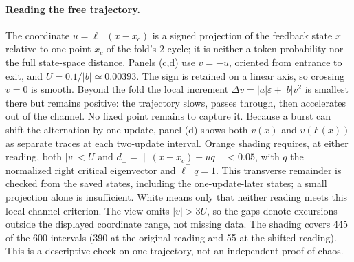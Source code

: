 \documentclass[11pt,letterpaper]{article}
\newcommand{\eps}{\varepsilon}
\begin{document}
\paragraph{Reading the free trajectory.}
The coordinate $u=\ell^\top(x-x_c)$ is a signed projection of the feedback state $x$ relative to one point $x_c$
of the fold's 2-cycle; it is neither a token probability nor the full state-space distance.
Panels (c,d) use $v=-u$, oriented from entrance to exit, and $U=0.1/|b|\simeq0.00393$.
The sign is retained on a linear axis, so crossing $v=0$ is smooth. Beyond the fold the local increment
$\Delta v=|a|\eps+|b|v^2$ is smallest there but remains positive: the trajectory slows, passes through, then accelerates
out of the channel. No fixed point remains to capture it.
Because a burst can shift the alternation by one update, panel (d) shows both $v(x)$ and $v(F(x))$ as separate
traces at each two-update interval. Orange shading requires, at either reading, both $|v|<U$ and
$d_\perp=\|(x-x_c)-u q\|<0.05$, with $q$ the normalized right critical eigenvector and $\ell^\top q=1$.
This transverse remainder is checked from the saved states, including the one-update-later states;
a small projection alone is insufficient. White means only that neither reading meets this local-channel criterion.
The view omits $|v|>3U$, so the gaps denote excursions outside the displayed coordinate range, not missing data.
The shading covers 445 of the 600 intervals (390 at the original reading and 55 at the shifted reading).
This is a descriptive check on one trajectory, not an independent proof of chaos.
\end{document}

